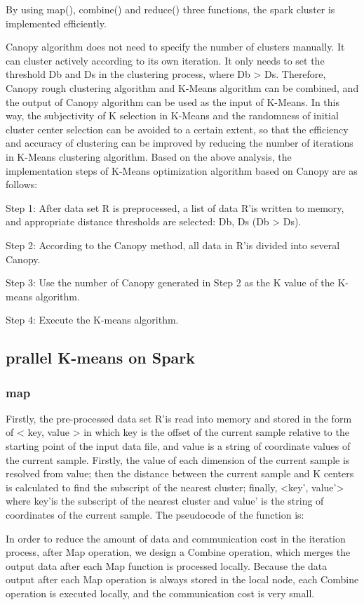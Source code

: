 \documentclass[runningheads]{llncs}
\begin{document}
By using map(), combine() and reduce() three functions, the spark cluster is implemented efficiently.

Canopy algorithm does not need to specify the number of clusters manually. It can cluster actively according to its own iteration. It only needs to set the threshold Db and Ds in the clustering process, where Db > Ds. Therefore, Canopy rough clustering algorithm and K-Means algorithm can be combined, and the output of Canopy algorithm can be used as the input of K-Means. In this way, the subjectivity of K selection in K-Means and the randomness of initial cluster center selection can be avoided to a certain extent, so that the efficiency and accuracy of clustering can be improved by reducing the number of iterations in K-Means clustering algorithm. Based on the above analysis, the implementation steps of K-Means optimization algorithm based on Canopy are as follows:

Step 1: After data set R is preprocessed, a list of data R'is written to memory, and appropriate distance thresholds are selected: Db, Ds (Db > Ds).

Step 2: According to the Canopy method, all data in R'is divided into several Canopy.

Step 3: Use the number of Canopy generated in Step 2 as the K value of the K-means algorithm.

Step 4: Execute the K-means algorithm.

\subsection{prallel K-means on Spark}
\subsubsection{map}
Firstly, the pre-processed data set R'is read into memory and stored in the form of < key, value > in which key is the offset of the current sample relative to the starting point of the input data file, and value is a string of coordinate values of the current sample. Firstly, the value of each dimension of the current sample is resolved from value; then the distance between the current sample and K centers is calculated to find the subscript of the nearest cluster; finally, <key', value'> where key'is the subscript of the nearest cluster and value' is the string of coordinates of the current sample. The pseudocode of the function is:

In order to reduce the amount of data and communication cost in the iteration process, after Map operation, we design a Combine operation, which merges the output data after each Map function is processed locally. Because the data output after each Map operation is always stored in the local node, each Combine operation is executed locally, and the communication cost is very small.
\end{document}
